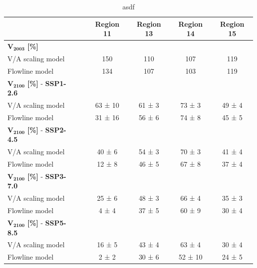    \begin{table}[htp]
        \centering
        \small

        \caption{asdf}
        \label{tab:cmip}
          
        \begin{tabular}{@{}llcccc@{}}
          \toprule
          {} & \phantom{a} & \textbf{Region 11} & \textbf{Region 13} & \textbf{Region 14} & \textbf{Region 15} \\
          \midrule
          $\mathbf{V_\text{2003}}$ \textbf{[\si{\percent}]} \\
          V/A scaling model & {} & 150 & 110 & 107 & 119\\
          Flowline model & \phantom{a} & 134 & 107 & 103 & 119\\
          $\mathbf{V_\text{2100}}$ \textbf{[\si{\percent}]} - \textbf{SSP1-2.6}\\
          V/A scaling model & {} & 63 ± 10 & 61 ± 3 & 73 ± 3 & 49 ± 4\\
          Flowline model & {} & 31 ± 16 & 56 ± 6 & 74 ± 8 & 45 ± 5\\
          $\mathbf{V_\text{2100}}$ \textbf{[\si{\percent}]} - \textbf{SSP2-4.5}\\
          V/A scaling model & {} & 40 ± 6 & 54 ± 3 & 70 ± 3 & 41 ± 4\\
          Flowline model & {} & 12 ± 8 & 46 ± 5 & 67 ± 8 & 37 ± 4\\
          $\mathbf{V_\text{2100}}$ \textbf{[\si{\percent}]} - \textbf{SSP3-7.0}\\
          V/A scaling model & {} & 25 ± 6 & 48 ± 3 & 66 ± 4 & 35 ± 3\\
          Flowline model & {} & 4 ± 4 & 37 ± 5 & 60 ± 9 & 30 ± 4\\
          $\mathbf{V_\text{2100}}$ \textbf{[\si{\percent}]} - \textbf{SSP5-8.5}\\
          V/A scaling model & {} & 16 ± 5 & 43 ± 4 & 63 ± 4 & 30 ± 4\\
          Flowline model & {} & 2 ± 2 & 30 ± 6 & 52 ± 10 & 24 ± 5\\
          \bottomrule
        \end{tabular}
      \end{table}


